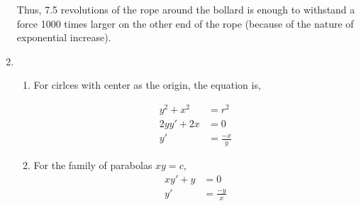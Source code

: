 \begin{enumerate}
          Thus, 7.5 revolutions of the rope around the bollard is enough to withstand a force 1000
          times larger on the other end of the rope (because of the nature of exponential increase).

    \item \begin{enumerate}
              \item For cirlces with center as the origin, the equation is,

                    \begin{align}
                        y^{2} + x^{2} & = r^{2}        \\
                        2yy' + 2x     & = 0            \\
                        y'            & = \frac{-x}{y}
                    \end{align}
              \item For the family of parabolas $ xy = c $,
                    \begin{align}
                        xy' + y & = 0            \\
                        y'      & = \frac{-y}{x}
                    \end{align}

\end{enumerate}
\end{enumerate}
